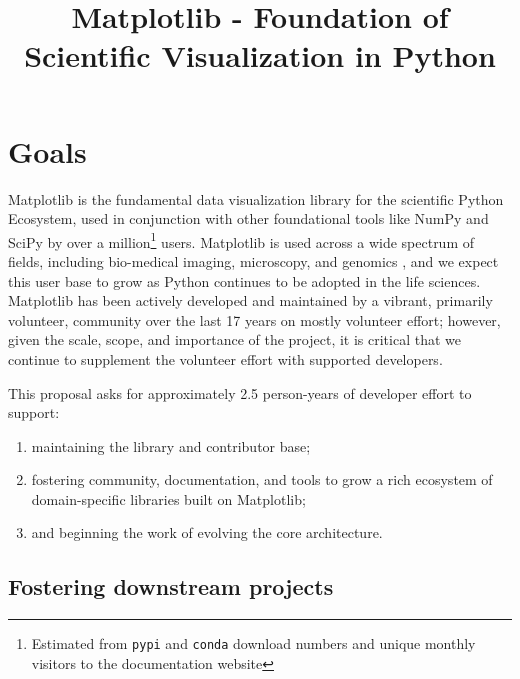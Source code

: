 \documentclass[12pt,letterpaper]{article}  %
\begin{document}
\title{Matplotlib - Foundation of Scientific Visualization in Python}
\author{}
\maketitle

\section{Goals}

Matplotlib\cite{Hunter:2007} is the fundamental
data visualization library for the scientific Python Ecosystem, used
in conjunction with other foundational tools like NumPy and
SciPy \cite{Jones2001,2020SciPy-NMeth} by over a million\footnote{Estimated from \texttt{pypi}
and \texttt{conda} download numbers and unique monthly visitors to the documentation website} users.
Matplotlib is used across a wide spectrum of fields, including bio-medical imaging,
microscopy, and genomics \cite{Carpenter2006,Wolf2018,10.7717/peerj.453,
  Segata2011,10.1371/journal.pgen.1000695,HASHIMSHONY2012666,
  10.1093/bioinformatics/bts480,Carlile2014,Laganowsky2014,Jiangaac9462,
  10.3389/fninf.2014.00014}, and we expect this user base to grow as Python
  continues to be adopted in the life sciences. %
Matplotlib has been actively developed and maintained by a vibrant,
primarily volunteer, community over the last 17 years on mostly volunteer effort; however, given
the scale, scope, and importance of the project, it is critical that we
continue to supplement the volunteer effort with supported developers.

This proposal asks for approximately 2.5 person-years of developer effort to support:

\begin{enumerate}[label=\alph*),noitemsep]
  \item maintaining the library and contributor base;
  \item fostering community, documentation, and tools to grow a rich ecosystem of domain-specific libraries built on Matplotlib;
  \item and beginning the work of evolving the core architecture.
\end{enumerate}

\subsection{Fostering downstream projects}
\label{sec:downstream}
\end{document}
